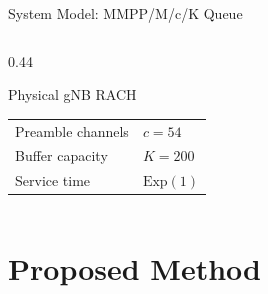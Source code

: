 \documentclass[aspectratio=169,t]{beamer}
\begin{document}
\begin{frame}{System Model: MMPP/M/c/K Queue}
\begin{columns}[T]
\begin{column}{0.44\textwidth}
      \vspace{8pt}
      \begin{block}{\small Physical gNB RACH}
        \small
        \renewcommand{\arraystretch}{1.2}
        \begin{tabular}{ll}
          Preamble channels & $c = 54$ \\
          Buffer capacity   & $K = 200$ \\
          Service time      & $\mathrm{Exp}(1)$ \\
        \end{tabular}
      \end{block}
    \end{column}
  \end{columns}

\end{frame}

\section{Proposed Method}
\end{document}
